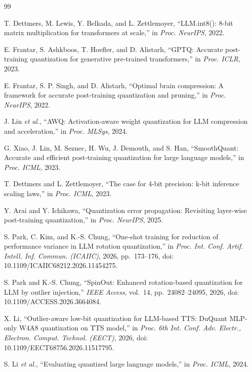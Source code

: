 \documentclass[10pt,twocolumn]{article}
\begin{document}
\begin{thebibliography}{99}
\small
\setlength{\itemsep}{2pt}

 T. Dettmers, M. Lewis, Y. Belkada, and L. Zettlemoyer,
``LLM.int8(): 8-bit matrix multiplication for transformers at scale,''
in \emph{Proc. NeurIPS}, 2022.

 E. Frantar, S. Ashkboos, T. Hoefler, and D. Alistarh,
``GPTQ: Accurate post-training quantization for generative pre-trained
transformers,'' in \emph{Proc. ICLR}, 2023.

 E. Frantar, S. P. Singh, and D. Alistarh, ``Optimal brain
compression: A framework for accurate post-training quantization and
pruning,'' in \emph{Proc. NeurIPS}, 2022.

 J. Lin \emph{et al.}, ``AWQ: Activation-aware weight
quantization for LLM compression and acceleration,'' in \emph{Proc.
MLSys}, 2024.

 G. Xiao, J. Lin, M. Seznec, H. Wu, J. Demouth, and S. Han,
``SmoothQuant: Accurate and efficient post-training quantization for
large language models,'' in \emph{Proc. ICML}, 2023.

 T. Dettmers and L. Zettlemoyer, ``The case for 4-bit
precision: k-bit inference scaling laws,'' in \emph{Proc. ICML}, 2023.

 Y. Arai and Y. Ichikawa, ``Quantization error propagation:
Revisiting layer-wise post-training quantization,'' in \emph{Proc.
NeurIPS}, 2025.

 S. Park, C. Kim, and K.-S. Chung, ``One-shot training for
reduction of performance variance in LLM rotation quantization,'' in
\emph{Proc. Int. Conf. Artif. Intell. Inf. Commun. (ICAIIC)}, 2026,
pp.~173--176, doi: 10.1109/ICAIIC68212.2026.11454275.

 S. Park and K.-S. Chung, ``SpinOut: Enhanced rotation-based
quantization for LLM by outlier injection,'' \emph{IEEE Access},
vol.~14, pp.~24082--24095, 2026, doi: 10.1109/ACCESS.2026.3664084.

 X. Li, ``Outlier-aware low-bit quantization for LLM-based
TTS: DuQuant MLP-only W4A8 quantization on TTS model,'' in \emph{Proc.
6th Int. Conf. Adv. Electr., Electron. Comput. Technol. (EECT)}, 2026,
doi: 10.1109/EECT68756.2026.11517795.

 S. Li \emph{et al.}, ``Evaluating quantized large language
models,'' in \emph{Proc. ICML}, 2024.


\end{thebibliography}
\end{document}
